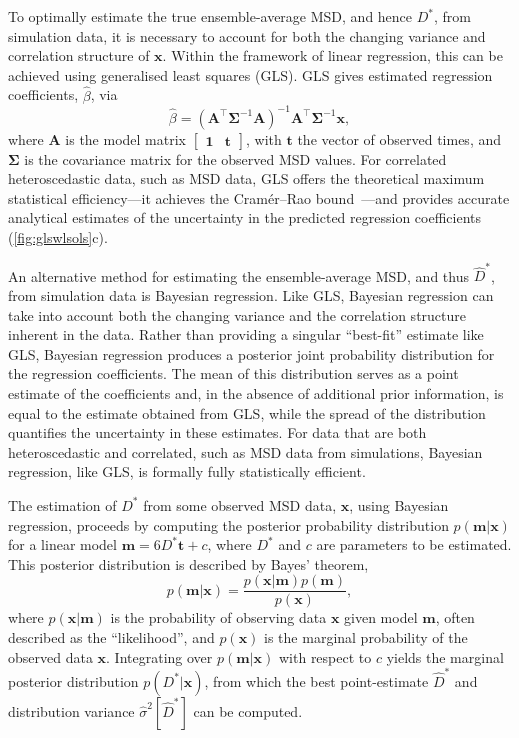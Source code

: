 \documentclass[reprint,superscriptaddress,nobibnotes,amsmath,amssymb,aps,prx,hidelinks]{revtex4-2}
\newcommand{\oMSD}{\ensuremath{\bm{x}}}
\newcommand{\modelmatrix}{\mathbf{A}}
\newcommand{\model}{\bm{m}}
\newcommand{\prob}[1]{\ensuremath{p(#1)}}
\newcommand{\Dest}{\ensuremath{\widehat{D}^*}}
\newcommand{\D}{\ensuremath{D^*}}
\newcommand{\varest}[1]{\ensuremath{\widehat{\sigma}^2[#1]}}
\begin{document}
To optimally estimate the true ensemble-average MSD, and hence $\D$, from simulation data, it is necessary to account for both the changing variance and correlation structure of $\oMSD$.
Within the framework of linear regression, this can be achieved using generalised least squares (GLS).
GLS gives estimated regression coefficients, $\widehat{\beta}$, via
\begin{equation}
    \widehat{\beta} = \left(\modelmatrix^{\top}\mathbf{\Sigma}^{-1}\modelmatrix\right)^{-1}\modelmatrix^{\top}\mathbf{\Sigma}^{-1}\oMSD,
    \label{equ:gls}
\end{equation} 
where $\modelmatrix$ is the model matrix $\begin{bmatrix}\mathbf{1} & \bm{t}\end{bmatrix}$, with $\bm{t}$ the vector of observed times, and $\mathbf{\Sigma}$ is the covariance matrix for the observed MSD values.
For correlated heteroscedastic data, such as MSD data, GLS offers the theoretical maximum statistical efficiency---it achieves the Cram\'er--Rao bound~\cite{cramer_mathematical_1946,rao_information_1945,rao_selected_1994,darmois_sur_1945,aitken_on_1942}---and provides accurate analytical estimates of the uncertainty in the predicted regression coefficients (\cref{fig:glswlsols}c).

An alternative method for estimating the ensemble-average MSD, and thus $\Dest$, from simulation data is Bayesian regression.
Like GLS, Bayesian regression can take into account both the changing variance and the correlation structure inherent in the data.
Rather than providing a singular ``best-fit'' estimate like GLS, Bayesian regression produces a posterior joint probability distribution for the regression coefficients.
The mean of this distribution serves as a point estimate of the coefficients and, in the absence of additional prior information, is equal to the estimate obtained from GLS, while the spread of the distribution quantifies the uncertainty in these estimates.
For data that are both heteroscedastic and correlated, such as MSD data from simulations, Bayesian regression, like GLS, is formally fully statistically efficient.

The estimation of $\D$ from some observed MSD data, $\oMSD$, using Bayesian regression, proceeds by computing the posterior probability distribution $\prob{\model|\oMSD}$ for a linear model $\model = 6\D \bm{t} + c$, where $\D$ and $c$ are parameters to be estimated.
This posterior distribution is described by Bayes' theorem,
\begin{equation}
    \prob{\model|\oMSD} = \frac{\prob{{\oMSD|\model}}\prob{\model}}{\prob{\oMSD}},
    \label{equ:bayes}
\end{equation}
where $\prob{\oMSD|\model}$ is the probability of observing data $\oMSD$ given model $\model$, often described as the ``likelihood'', and $\prob{\oMSD}$ is the marginal probability of the observed data $\oMSD$.
Integrating over $\prob{\model|\oMSD}$ with respect to $c$ yields the marginal posterior distribution $\prob{\D|\oMSD}$, from which the best point-estimate $\Dest$ and distribution variance $\varest{\Dest}$ can be computed.
\end{document}

